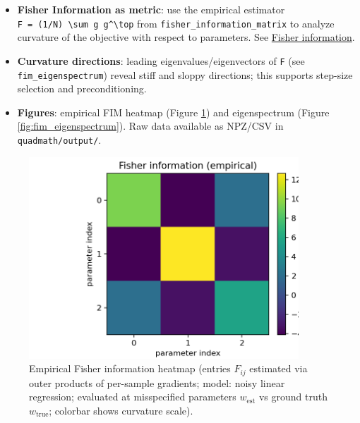 \documentclass[
  10pt,
]{article}
\providecommand{\tightlist}{%
  \setlength{\itemsep}{0pt}\setlength{\parskip}{0pt}}
\begin{document}
\begin{itemize}
\tightlist
\item
  \textbf{Fisher Information as metric}: use the empirical estimator
  \texttt{F\ =\ (1/N)\ \textbackslash{}sum\ g\ g\^{}\textbackslash{}top}
  from \texttt{fisher\_information\_matrix} to analyze curvature of the
  objective with respect to parameters. See
  \href{https://en.wikipedia.org/wiki/Fisher_information}{Fisher
  information}.
\item
  \textbf{Curvature directions}: leading eigenvalues/eigenvectors of
  \texttt{F} (see \texttt{fim\_eigenspectrum}) reveal stiff and sloppy
  directions; this supports step-size selection and preconditioning.
\item
  \textbf{Figures}: empirical FIM heatmap (Figure
  \ref{fig:fisher_information_matrix}) and eigenspectrum (Figure
  \ref{fig:fim_eigenspectrum}). Raw data available as NPZ/CSV in
  \texttt{quadmath/output/}.
\end{itemize}

\begin{figure}[htbp]
\centering
\includegraphics[width=0.9\textwidth]{figures/fisher_information_matrix.png}
\caption{Empirical Fisher information heatmap (entries $F_{ij}$ estimated via outer products of per-sample gradients; model: noisy linear regression; evaluated at misspecified parameters $w_\text{est}$ vs ground truth $w_\text{true}$; colorbar shows curvature scale).}
\label{fig:fisher_information_matrix}
\end{figure}
\end{document}
